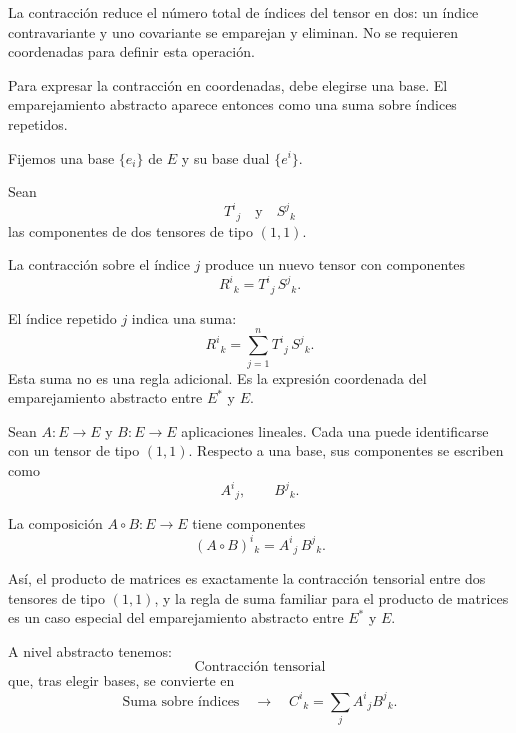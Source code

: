 \medskip

La contracción reduce el número total de índices del tensor en dos: un índice
contravariante y uno covariante se emparejan y eliminan.
No se requieren coordenadas para definir esta operación.

\medskip

Para expresar la contracción en coordenadas, debe elegirse una base.
El emparejamiento abstracto aparece entonces como una suma sobre índices repetidos.

\medskip

Fijemos una base $\{e_i\}$ de $E$ y su base dual $\{e^i\}$.

Sean
\[
T^{i}{}_{j}
\quad\text{y}\quad
S^{j}{}_{k}
\]
las componentes de dos tensores de tipo $(1,1)$.

\medskip

La contracción sobre el índice $j$ produce un nuevo tensor con componentes
\[
R^{i}{}_{k}
=
T^{i}{}_{j} \, S^{j}{}_{k}.
\]

El índice repetido $j$ indica una suma:
\[
R^{i}{}_{k}
=
\sum_{j=1}^{n}
T^{i}{}_{j} \, S^{j}{}_{k}.
\]
Esta suma no es una regla adicional.
Es la expresión coordenada del emparejamiento abstracto entre $E^*$ y $E$.

\medskip

Sean $A : E \to E$ y $B : E \to E$ aplicaciones lineales.
Cada una puede identificarse con un tensor de tipo $(1,1)$.
Respecto a una base, sus componentes se escriben como
\[
A^{i}{}_{j},
\qquad
B^{j}{}_{k}.
\]

La composición $A \circ B : E \to E$ tiene componentes
\[
(A \circ B)^{i}{}_{k}
=
A^{i}{}_{j} \, B^{j}{}_{k}.
\]

Así, el producto de matrices es exactamente la contracción tensorial entre dos
tensores de tipo $(1,1)$, y la regla de suma familiar para el producto de
matrices es un caso especial del emparejamiento abstracto entre $E^*$ y $E$.

\medskip

A nivel abstracto tenemos:
\[
\text{Contracción tensorial}
\]
que, tras elegir bases, se convierte en
\[
\text{Suma sobre índices}
\quad\longrightarrow\quad
C^{i}{}_{k} = \sum_j A^{i}{}_{j} B^{j}{}_{k}.
\]


